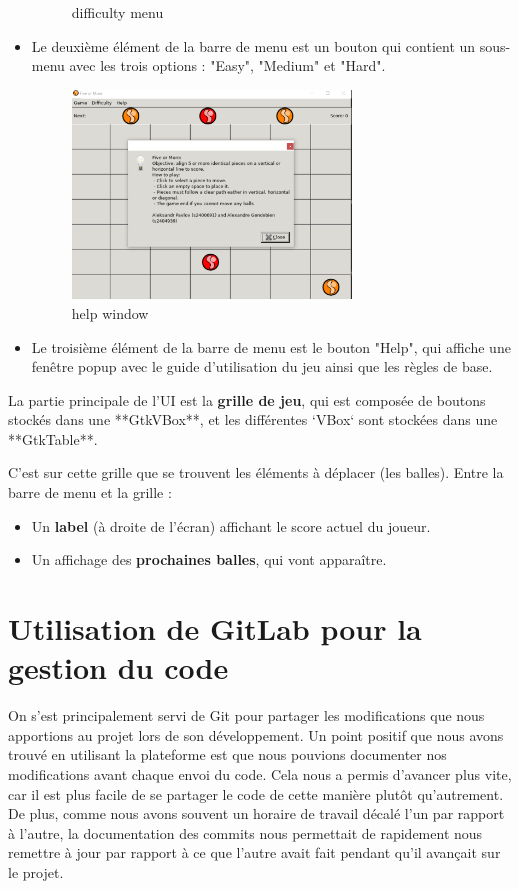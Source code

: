 \documentclass[a4paper, 11pt, oneside]{article}
\begin{document}
\begin{itemize}
\begin{figure}[h]
        \caption{difficulty menu}
    \end{figure}
    \item Le deuxième élément de la barre de menu est un bouton qui contient un sous-menu avec les trois options : "Easy", "Medium" et "Hard".
    \begin{figure}[h]
        \centering
        \includegraphics[width=0.7\textwidth]{help.png}
        \caption{help window}
    \end{figure}
    \item Le troisième élément de la barre de menu est le bouton "Help", qui affiche une fenêtre popup avec le guide d'utilisation du jeu ainsi que les règles de base.
\end{itemize}

La partie principale de l'UI est la \textbf{grille de jeu}, qui est composée de boutons stockés dans une **GtkVBox**, et les différentes `VBox` sont stockées dans une **GtkTable**.

C'est sur cette grille que se trouvent les éléments à déplacer (les balles). Entre la barre de menu et la grille :
\begin{itemize}
    \item Un \textbf{label} (à droite de l'écran) affichant le score actuel du joueur.
    \item Un affichage des \textbf{prochaines balles}, qui vont apparaître.
\end{itemize}

\section{Utilisation de GitLab pour la gestion du code}
On s’est principalement servi de Git pour partager les modifications que nous apportions au projet lors de son développement.
Un point positif que nous avons trouvé en utilisant la plateforme est que nous pouvions documenter nos modifications avant chaque envoi du code.
Cela nous a permis d’avancer plus vite, car il est plus facile de se partager le code de cette manière plutôt qu’autrement.
De plus, comme nous avons souvent un horaire de travail décalé l’un par rapport à l’autre, la documentation des commits nous permettait de rapidement nous remettre à jour par rapport à ce que l’autre avait fait pendant qu'il avançait sur le projet.
\end{document}
